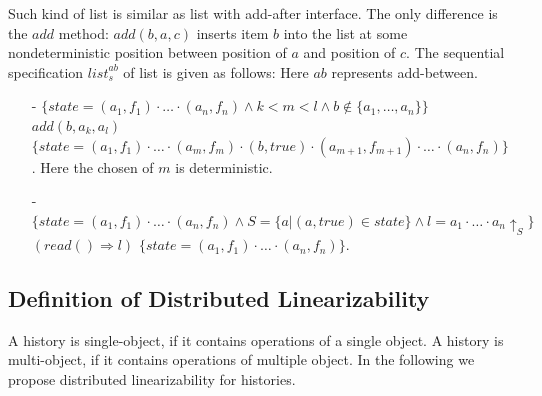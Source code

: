 \begin{example}
\label{definition:sequential specification of list with add-after interface}
Such kind of list is similar as list with add-after interface. The only difference is the $\mathit{add}$ method: $\mathit{add}(b,a,c)$ inserts item $b$ into the list at some nondeterministic position between position of $a$ and position of $c$. The sequential specification $\mathit{list}_s^{\mathit{ab}}$ of list is given as follows: Here $\mathit{ab}$ represents add-between.
\begin{itemize}
\setlength{\itemsep}{0.5pt}
\item[-] $\{ \mathit{state} = (a_1,f_1) \cdot \ldots \cdot (a_n,f_n) \wedge k < m < l \wedge b \notin \{ a_1, \ldots, a_n \} \}$ $add(b,a_k,a_l)$ $\{ \mathit{state} = (a_1,f_1) \cdot \ldots \cdot (a_m,f_m) \cdot (b,\mathit{true}) \cdot (a_{m+1},f_{m+1}) \cdot \ldots \cdot (a_n,f_n) \}$. Here the chosen of $m$ is deterministic.
\item[-] $\{ \mathit{state} = (a_1,f_1) \cdot \ldots \cdot (a_n,f_n) \wedge S = \{ a \vert (a,\mathit{true}) \in \mathit{state} \} \wedge l = a_1 \cdot \ldots \cdot a_n \uparrow_{S} \}$ $(read() \Rightarrow l)$ $\{ \mathit{state} = (a_1,f_1) \cdot \ldots \cdot (a_n,f_n) \}$.
\end{itemize}
\end{example}







\subsection{Definition of Distributed Linearizability}
\label{subsec:definition of distributed linearizability}

A history is single-object, if it contains operations of a single object. A history is multi-object, if it contains operations of multiple object. In the following we propose distributed linearizability for histories.


